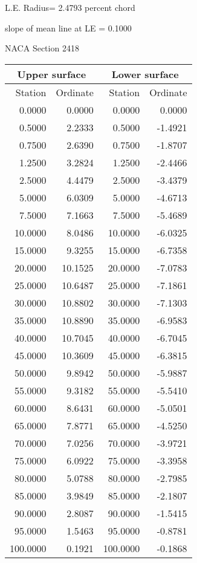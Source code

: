 \documentclass[11pt]{book}
\begin{document}
L.E. Radius=  2.4793 percent chord


 slope of mean line at LE =  0.1000
 \newpage
  \label{s2418}
 \begin{Large}
 NACA Section 2418
 \end{Large}
  
 \vspace{8mm}
 \begin{tabular}{|r|r|r|r|} \hline 
 \multicolumn{2}{|c|}{Upper surface} & \multicolumn{2}{|c|}{Lower surface} \\
 \hline
 Station & Ordinate & Station & Ordinate \\
 \hline
0.0000 & 0.0000 & 0.0000 & 0.0000 \\
0.5000 & 2.2333 & 0.5000 & -1.4921 \\
0.7500 & 2.6390 & 0.7500 & -1.8707 \\
1.2500 & 3.2824 & 1.2500 & -2.4466 \\
2.5000 & 4.4479 & 2.5000 & -3.4379 \\
5.0000 & 6.0309 & 5.0000 & -4.6713 \\
7.5000 & 7.1663 & 7.5000 & -5.4689 \\
10.0000 & 8.0486 & 10.0000 & -6.0325 \\
15.0000 & 9.3255 & 15.0000 & -6.7358 \\
20.0000 & 10.1525 & 20.0000 & -7.0783 \\
25.0000 & 10.6487 & 25.0000 & -7.1861 \\
30.0000 & 10.8802 & 30.0000 & -7.1303 \\
35.0000 & 10.8890 & 35.0000 & -6.9583 \\
40.0000 & 10.7045 & 40.0000 & -6.7045 \\
45.0000 & 10.3609 & 45.0000 & -6.3815 \\
50.0000 & 9.8942 & 50.0000 & -5.9887 \\
55.0000 & 9.3182 & 55.0000 & -5.5410 \\
60.0000 & 8.6431 & 60.0000 & -5.0501 \\
65.0000 & 7.8771 & 65.0000 & -4.5250 \\
70.0000 & 7.0256 & 70.0000 & -3.9721 \\
75.0000 & 6.0922 & 75.0000 & -3.3958 \\
80.0000 & 5.0788 & 80.0000 & -2.7985 \\
85.0000 & 3.9849 & 85.0000 & -2.1807 \\
90.0000 & 2.8087 & 90.0000 & -1.5415 \\
95.0000 & 1.5463 & 95.0000 & -0.8781 \\
100.0000 & 0.1921 & 100.0000 & -0.1868 \\
 \hline 
 \end{tabular}
\end{document}

